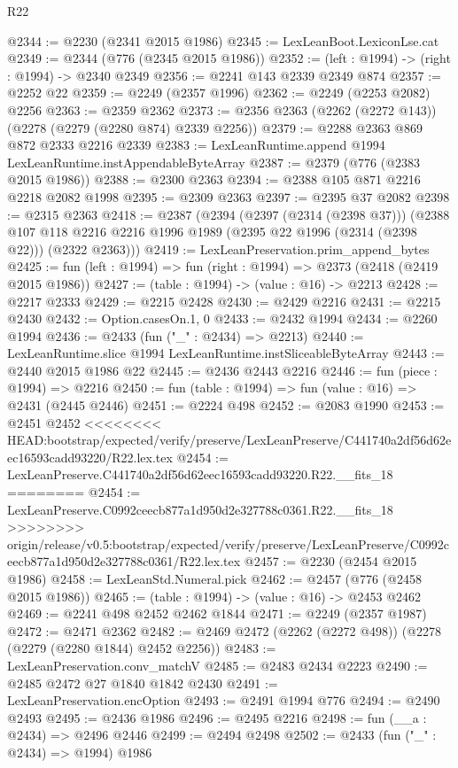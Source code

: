 \begin{lexlean}{R22}
\begin{coremodule}
{{{{{{{{{{{{{{{{{{{{{{{{{{{{{{{{{{{{{{{{{{{{{{{{{{{{@2344 := @2230 (@2341 @2015 @1986)
@2345 := LexLeanBoot.LexiconLse.cat
@2349 := @2344 (@776 (@2345 @2015 @1986))
@2352 := (left : @1994) -> (right : @1994) -> @2340 @2349
@2356 := @2241 @143 @2339 @2349 @874
@2357 := @2252 @22
@2359 := @2249 (@2357 @1996)
@2362 := @2249 (@2253 @2082) @2256
@2363 := @2359 @2362
@2373 := @2356 @2363 (@2262 (@2272 @143)) (@2278 (@2279 (@2280 @874) @2339 @2256))
@2379 := @2288 @2363 @869 @872 @2333 @2216 @2339
@2383 := LexLeanRuntime.append @1994 LexLeanRuntime.instAppendableByteArray
@2387 := @2379 (@776 (@2383 @2015 @1986))
@2388 := @2300 @2363
@2394 := @2388 @105 @871 @2216 @2218 @2082 @1998
@2395 := @2309 @2363
@2397 := @2395 @37 @2082
@2398 := @2315 @2363
@2418 := @2387
    (@2394
      (@2397 (@2314 (@2398 @37)))
      (@2388 @107 @118 @2216 @2216 @1996 @1989 (@2395 @22 @1996 (@2314 (@2398 @22))) (@2322 @2363)))
@2419 := LexLeanPreservation.prim_append_bytes
@2425 := fun (left : @1994) => fun (right : @1994) => @2373 (@2418 (@2419 @2015 @1986))
@2427 := (table : @1994) -> (value : @16) -> @2213
@2428 := @2217 @2333
@2429 := @2215 @2428
@2430 := @2429 @2216
@2431 := @2215 @2430
@2432 := Option.casesOn.{1, 0}
@2433 := @2432 @1994
@2434 := @2260 @1994
@2436 := @2433 (fun ("_" : @2434) => @2213)
@2440 := LexLeanRuntime.slice @1994 LexLeanRuntime.instSliceableByteArray
@2443 := @2440 @2015 @1986 @22
@2445 := @2436 @2443 @2216
@2446 := fun (piece : @1994) => @2216
@2450 := fun (table : @1994) => fun (value : @16) => @2431 (@2445 @2446)
@2451 := @2224 @498
@2452 := @2083 @1990
@2453 := @2451 @2452
<<<<<<<< HEAD:bootstrap/expected/verify/preserve/LexLeanPreserve/C441740a2df56d62eec16593cadd93220/R22.lex.tex
@2454 := LexLeanPreserve.C441740a2df56d62eec16593cadd93220.R22.__fits_18
========
@2454 := LexLeanPreserve.C0992ceecb877a1d950d2e327788c0361.R22.__fits_18
>>>>>>>> origin/release/v0.5:bootstrap/expected/verify/preserve/LexLeanPreserve/C0992ceecb877a1d950d2e327788c0361/R22.lex.tex
@2457 := @2230 (@2454 @2015 @1986)
@2458 := LexLeanStd.Numeral.pick
@2462 := @2457 (@776 (@2458 @2015 @1986))
@2465 := (table : @1994) -> (value : @16) -> @2453 @2462
@2469 := @2241 @498 @2452 @2462 @1844
@2471 := @2249 (@2357 @1987)
@2472 := @2471 @2362
@2482 := @2469 @2472 (@2262 (@2272 @498)) (@2278 (@2279 (@2280 @1844) @2452 @2256))
@2483 := LexLeanPreservation.conv_matchV
@2485 := @2483 @2434 @2223
@2490 := @2485 @2472 @27 @1840 @1842 @2430
@2491 := LexLeanPreservation.encOption
@2493 := @2491 @1994 @776
@2494 := @2490 @2493
@2495 := @2436 @1986
@2496 := @2495 @2216
@2498 := fun (__a : @2434) => @2496 @2446
@2499 := @2494 @2498
@2502 := @2433 (fun ("_" : @2434) => @1994) @1986
}}}}}}}}}}}}}}}}}}}}}}}}}}}}}}}}}}}}}}}}}}}}}}}}}}}}
\end{coremodule}
\end{lexlean}
